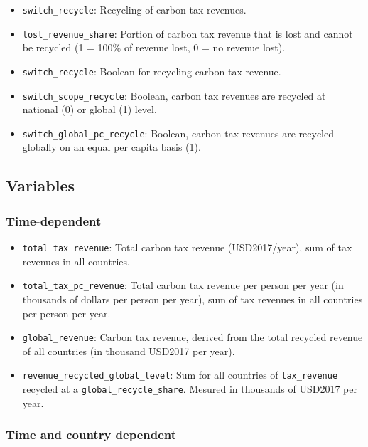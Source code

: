 \documentclass[
]{article}
\providecommand{\tightlist}{%
  \setlength{\itemsep}{0pt}\setlength{\parskip}{0pt}}
\begin{document}
\begin{itemize}
\tightlist
\item
  \texttt{switch\_recycle}: Recycling of carbon tax revenues.
\item
  \texttt{lost\_revenue\_share}: Portion of carbon tax revenue that is
  lost and cannot be recycled (1 = 100\% of revenue lost, 0 = no revenue
  lost).
\item
  \texttt{switch\_recycle}: Boolean for recycling carbon tax revenue.
\item
  \texttt{switch\_scope\_recycle}: Boolean, carbon tax revenues are
  recycled at national (0) or global (1) level.
\item
  \texttt{switch\_global\_pc\_recycle}: Boolean, carbon tax revenues are
  recycled globally on an equal per capita basis (1).
\end{itemize}

\subsection{Variables}\label{variables-7}

\subsubsection{Time-dependent}\label{time-dependent-6}

\begin{itemize}
\tightlist
\item
  \texttt{total\_tax\_revenue}: Total carbon tax revenue (USD2017/year), sum
  of tax revenues in all countries.
\item
  \texttt{total\_tax\_pc\_revenue}: Total carbon tax revenue per person per year
  (in thousands of dollars per person per year), sum of tax revenues in all
  countries per person per year.
\item
  \texttt{global\_revenue}: Carbon tax revenue, derived from the total
  recycled revenue of all countries (in thousand USD2017 per year).
  \item 
  \texttt{revenue\_recycled\_global\_level}: Sum for all countries of \texttt{tax\_revenue} recycled at a \texttt{global\_recycle\_share}. 
  Mesured in thousands of USD2017 per year.
\end{itemize}

\subsubsection{Time and country
dependent}\label{time-and-country-dependent-13}
\end{document}
